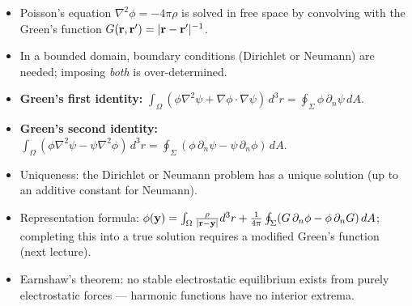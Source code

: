 \begin{itemize}
  \item Poisson's equation $\nabla^2\phi = -4\pi\rho$ is solved in free space by
        convolving with the Green's function $G(\mathbf{r},\mathbf{r}') = |\mathbf{r}-\mathbf{r}'|^{-1}$.
  \item In a bounded domain, boundary conditions (Dirichlet or Neumann) are needed;
        imposing \emph{both} is over-determined.
  \item \textbf{Green's first identity:}
        $\int_\Omega(\phi\nabla^2\psi + \nabla\phi\cdot\nabla\psi)\,d^3r =
        \oint_\Sigma\phi\,\partial_n\psi\,dA$.
  \item \textbf{Green's second identity:}
        $\int_\Omega(\phi\nabla^2\psi - \psi\nabla^2\phi)\,d^3r =
        \oint_\Sigma(\phi\,\partial_n\psi - \psi\,\partial_n\phi)\,dA$.
  \item Uniqueness: the Dirichlet or Neumann problem has a unique solution
        (up to an additive constant for Neumann).
  \item Representation formula: $\phi(\mathbf{y}) = \int_\Omega\frac{\rho}{|\mathbf{r}-\mathbf{y}|}d^3r
        + \frac{1}{4\pi}\oint_\Sigma(G\,\partial_n\phi - \phi\,\partial_n G)\,dA$;
        completing this into a true solution requires a modified Green's function (next lecture).
  \item Earnshaw's theorem: no stable electrostatic equilibrium exists from purely
        electrostatic forces — harmonic functions have no interior extrema.
\end{itemize}
